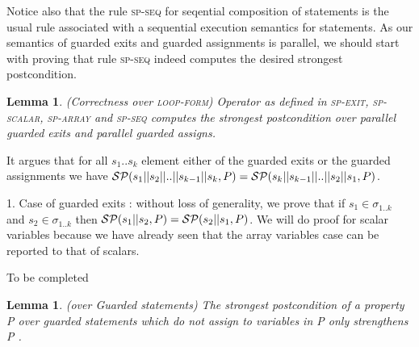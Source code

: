 \documentclass[a4paper,10pt]{article}
\newcommand{\loopform}{\textsc{loop-form}\xspace}
\newcommand{\vstate}[2]{\ensuremath{\sigma^{\mathit{#1}}_{\mathit{#2}}\xspace}}
\newcommand{\spexit}{\textsc{sp-exit}\xspace}
\newcommand{\spscalar}{\textsc{sp-scalar}\xspace}
\newcommand{\sparray}{\textsc{sp-array}\xspace}
\newcommand{\spseq}{\textsc{sp-seq}\xspace}
\newtheorem{lemma}[theorem]{Lemma}
\newcounter{proofnum} %
\newcounter{pc} %
\newenvironment{proof}[1][Proof.]{\refstepcounter{proofnum}\begin{trivlist}
\item[\hskip \labelsep {\bfseries #1}]}{\end{trivlist}}
\begin{document}
Notice also that the rule \spseq for seqential composition of statements is the
usual rule associated with a sequential execution semantics for statements. As
our semantics of guarded exits and guarded assignments is parallel, we should
start with proving that rule \spseq indeed computes the desired strongest
postcondition.  

\begin{lemma}
  \emph{(\spostsym Correctness over \loopform)} Operator \spostsym as defined in \spexit,
  \spscalar, \sparray and \spseq computes the strongest postcondition over
  parallel guarded exits and parallel guarded assigns.
\label{lemma:sp-correctness}
\end{lemma}

\begin{proof}
  It argues that for all $s_1 .. s_k$ element either of the guarded exits or the guarded assignments
  we have $\mathcal{SP}(s_1||s_2|| .. ||s_{k-1}||s_k,P)=\mathcal{SP}(s_k||s_{k-1}|| .. ||s_2||s_1,P)$. 

1. Case of guarded exits : without loss of generality, 
   we prove that if $s_1 \in \vstate{}{1..k}$ and $s_2 \in \vstate{}{1..k}$ then  
   $\mathcal{SP}(s_1||s_2,P)=\mathcal{SP}(s_2||s_1,P)$. We will do proof for scalar variables 
   because we have already seen that the array variables case can be reported to that of scalars.

   To be completed
\end{proof}

\begin{lemma}
  \emph{(\spostsym over Guarded statements)} The strongest postcondition of a
property P over guarded statements which do not assign to variables in P only
strengthens P .

\label{lemma:sp-g-statements}
\end{lemma}
\end{document}
